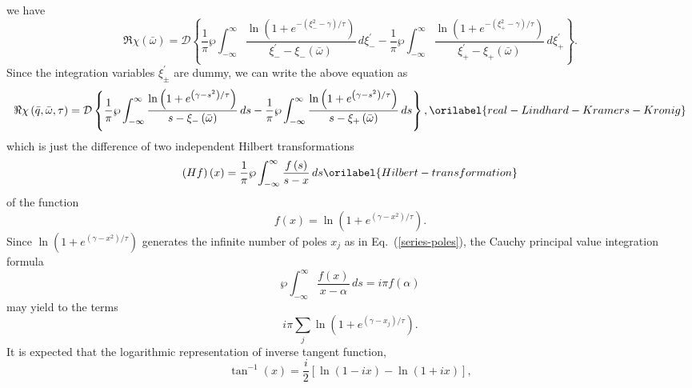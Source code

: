 \documentclass[aps,showkeys,noshowpacs,superscriptaddress,pre,preprint]{revtex4-2}
\let\label\orilabel
\begin{document}
we have
\begin{equation*}
\Re \chi\left( \bar{\omega} \right) = \mathcal{D} \left\{
\frac{1}{\pi} \wp \int_{-\infty}^{\infty} \frac{\ln\left( 1+ e^{-\left( \xi_-^2 - \gamma \right) / \tau} \right)}{
\xi_-^\prime - \xi_- \left( \bar{\omega} \right)}
\, d\xi_-^\prime
- \frac{1}{\pi} \wp \int_{-\infty}^{\infty} \frac{\ln\left( 1+ e^{-\left( \xi_+^2 - \gamma \right) / \tau} \right)}{
\xi_+^\prime - \xi_+ \left( \bar{\omega} \right)}
\, d\xi_+^\prime
\right\} .
\end{equation*}
Since the integration variables $\xi_\pm^\prime$ are dummy,
we can write the above equation as
\begin{equation}
\Re \chi\left( \bar{q}, \bar{\omega}, \tau \right) = \mathcal{D} \left\{
\frac{1}{\pi} \wp \int_{-\infty}^{\infty} \frac{\ln\left( 1+ e^{\left( \gamma - s^2 \right) / \tau} \right)}{
s - \xi_- \left( \bar{\omega} \right)}
\, ds
- \frac{1}{\pi} \wp \int_{-\infty}^{\infty} \frac{\ln\left( 1+ e^{\left( \gamma - s^2 \right) / \tau} \right)}{
s - \xi_+ \left( \bar{\omega} \right)}
\, ds
\right\} ,
\label{real-Lindhard-Kramers-Kronig}
\end{equation}
which is just the difference of two independent Hilbert transformations 
\begin{equation}
\left( H f \right) \left( x \right) 
= \frac{1}{\pi} \wp \int_{-\infty}^{\infty} \frac{f\left( s \right)}{s - x} \, ds 
\label{Hilbert-transformation}
\end{equation}
of the function
\begin{equation*}
f\left( x \right) = \ln\left( 1 + e^{\left( \gamma - x^2 \right) / \tau} \right) .
\end{equation*}
Since $\ln\left( 1 + e^{\left( \gamma - x^2 \right) / \tau} \right)$ generates
the infinite number of poles $x_j$ as in Eq.~(\ref{series-poles}),
the Cauchy principal value integration formula~\cite{Arfken-Weber1995,Byron-Fuller1992}
\begin{equation*}
\wp \int_{-\infty}^{\infty} \frac{f\left( x \right)}{x - \alpha} \, ds
= i \pi  f\left( \alpha \right)
\end{equation*}
may yield to the terms
\begin{equation*}
i \pi \sum_j \ln\left( 1 + e^{\left( \gamma - x_j \right) / \tau} \right) .
\end{equation*}
It is expected that the logarithmic representation of inverse tangent function,
\begin{equation*}
\tan^{-1}(x) = \frac{i}{2} \left[ \ln\left( 1 - i x \right)  - \ln\left( 1 + i x \right) \right],
\end{equation*}
\end{document}

